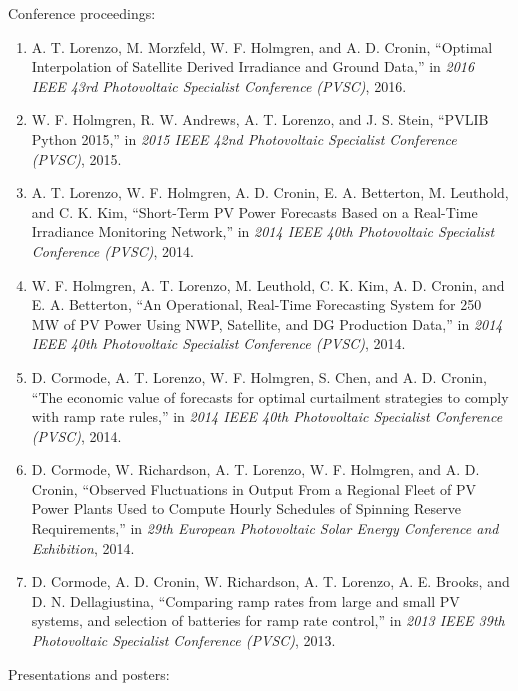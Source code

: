 \noindent Conference proceedings:
\begin{enumerate}
\item A. T. Lorenzo, M. Morzfeld, W. F. Holmgren, and A. D. Cronin,
``Optimal Interpolation of Satellite Derived Irradiance and Ground
Data,'' in \emph{2016 IEEE 43rd Photovoltaic Specialist Conference
(PVSC)}, 2016.

\item W. F. Holmgren, R. W. Andrews, A. T. Lorenzo, and J. S. Stein,
``PVLIB Python 2015,'' in \emph{2015 IEEE 42nd Photovoltaic Specialist
Conference (PVSC)}, 2015.

\item A. T. Lorenzo, W. F. Holmgren, A. D. Cronin, E. A. Betterton,
M. Leuthold, and C. K. Kim, ``Short-Term PV Power Forecasts Based on a
Real-Time Irradiance Monitoring Network,'' in \emph{2014 IEEE 40th
Photovoltaic Specialist Conference (PVSC)}, 2014.

\item W. F. Holmgren, A. T. Lorenzo, M. Leuthold, C. K. Kim,
  A. D. Cronin, and E. A. Betterton, ``An Operational, Real-Time
  Forecasting System for 250 MW of PV Power Using NWP, Satellite, and
  DG Production Data,'' in \emph{2014 IEEE 40th Photovoltaic
Specialist Conference (PVSC)}, 2014.

\item D. Cormode, A. T. Lorenzo, W. F. Holmgren, S. Chen, and
A. D. Cronin, ``The economic value of forecasts for optimal
curtailment strategies to comply with ramp rate rules,'' in \emph{2014
IEEE 40th Photovoltaic Specialist Conference (PVSC)}, 2014.

\item D. Cormode, W. Richardson, A. T. Lorenzo, W. F. Holmgren, and
  A. D. Cronin, ``Observed Fluctuations in Output From a Regional
  Fleet of PV Power Plants Used to Compute Hourly Schedules of
  Spinning Reserve Requirements,'' in \emph{29th European Photovoltaic
  Solar Energy Conference and Exhibition}, 2014.

\item D. Cormode, A. D. Cronin, W. Richardson, A. T. Lorenzo,
A. E. Brooks, and D. N. Dellagiustina, ``Comparing ramp rates from
large and small PV systems, and selection of batteries for ramp rate
control,'' in \emph{2013 IEEE 39th Photovoltaic Specialist Conference
(PVSC)}, 2013.

\end{enumerate}


\noindent Presentations and posters:

